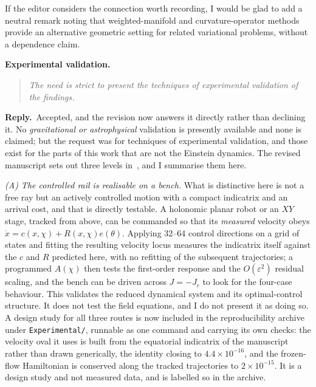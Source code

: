 \documentclass[11pt]{article}
\newenvironment{referee}
  {\begin{quote}\itshape\small}
  {\end{quote}}
\newcommand{\reply}{\par\noindent\textbf{Reply.}\ }
\newcommand{\R}[1]{\par\medskip\noindent\textbf{#1}\par\nopagebreak}
\begin{document}
If the editor considers the connection worth recording, I would be glad to add a
neutral remark noting that weighted-manifold and curvature-operator methods
provide an alternative geometric setting for related variational problems,
without a dependence claim.

\R{Experimental validation.}

\begin{referee}
The need is strict to present the techniques of experimental validation of the
findings.
\end{referee}

\reply Accepted, and the revision now answers it directly rather than declining
it. No \emph{gravitational or astrophysical} validation is presently available and
none is claimed; but the request was for techniques of experimental validation, and
those exist for the parts of this work that are not the Einstein dynamics. The
revised manuscript sets out three levels in~\msAppValidation, and I
summarise them here.

\emph{(A) The controlled rail is realisable on a bench.} What is distinctive here is
not a free ray but an actively controlled motion with a compact indicatrix and an
arrival cost, and that is directly testable. A holonomic planar robot or an $XY$
stage, tracked from above, can be commanded so that its \emph{measured} velocity
obeys $\dot x=c(x,\chi)+R(x,\chi)e(\theta)$. Applying 32--64 control directions on a
grid of states and fitting the resulting velocity locus measures the indicatrix
itself against the $c$ and $R$ predicted here, with no refitting of the subsequent
trajectories; a programmed $A(\chi)$ then tests the first-order response and the
$O(\varepsilon^2)$ residual scaling, and the bench can be driven across $J=-J_c$ to
look for the four-case behaviour. This validates the reduced dynamical system and
its optimal-control structure. It does not test the field equations, and I do not
present it as doing so. A design study for all three routes is now included in the
reproducibility archive under \texttt{Experimental/}, runnable as one command and
carrying its own checks: the velocity oval it uses is built from the equatorial
indicatrix of the manuscript rather than drawn generically, the identity closing to
$4.4\times10^{-16}$, and the frozen-flow Hamiltonian is conserved along the tracked
trajectories to $2\times10^{-15}$. It is a design study and not measured data, and
is labelled so in the archive.
\end{document}
